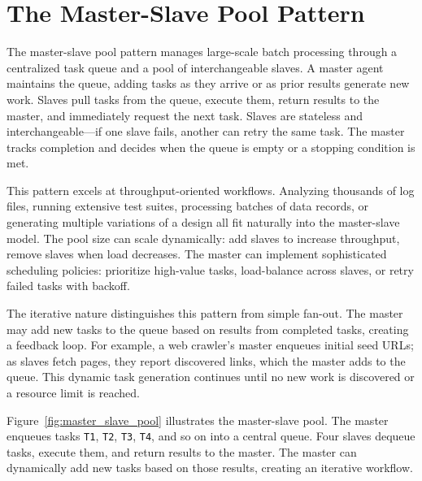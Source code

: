 \section{The Master-Slave Pool Pattern}\label{sec:master_slave}

The master-slave pool pattern manages large-scale batch processing through a centralized task queue and a pool of interchangeable slaves.
A master agent maintains the queue, adding tasks as they arrive or as prior results generate new work.
Slaves pull tasks from the queue, execute them, return results to the master, and immediately request the next task.
Slaves are stateless and interchangeable---if one slave fails, another can retry the same task.
The master tracks completion and decides when the queue is empty or a stopping condition is met.

This pattern excels at throughput-oriented workflows.
Analyzing thousands of log files, running extensive test suites, processing batches of data records, or generating multiple variations of a design all fit naturally into the master-slave model.
The pool size can scale dynamically: add slaves to increase throughput, remove slaves when load decreases.
The master can implement sophisticated scheduling policies: prioritize high-value tasks, load-balance across slaves, or retry failed tasks with backoff.

The iterative nature distinguishes this pattern from simple fan-out.
The master may add new tasks to the queue based on results from completed tasks, creating a feedback loop.
For example, a web crawler's master enqueues initial seed URLs; as slaves fetch pages, they report discovered links, which the master adds to the queue.
This dynamic task generation continues until no new work is discovered or a resource limit is reached.

Figure~\ref{fig:master_slave_pool} illustrates the master-slave pool.
The master enqueues tasks \texttt{T1}, \texttt{T2}, \texttt{T3}, \texttt{T4}, and so on into a central queue.
Four slaves dequeue tasks, execute them, and return results to the master.
The master can dynamically add new tasks based on those results, creating an iterative workflow.

